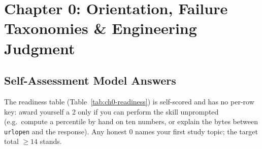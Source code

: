 \section{Chapter 0: Orientation, Failure Taxonomies \& Engineering Judgment}
\label{sec:sol-ch0}

\subsection{Self-Assessment Model Answers}

The readiness table (Table~\ref{tab:ch0-readiness}) is self-scored and has no
per-row key: award yourself a 2 only if you can perform the skill unprompted
(e.g.\ compute a percentile by hand on ten numbers, or explain the bytes
between \texttt{urlopen} and the response). Any honest 0 names your first
study topic; the target total $\geq 14$ stands.

